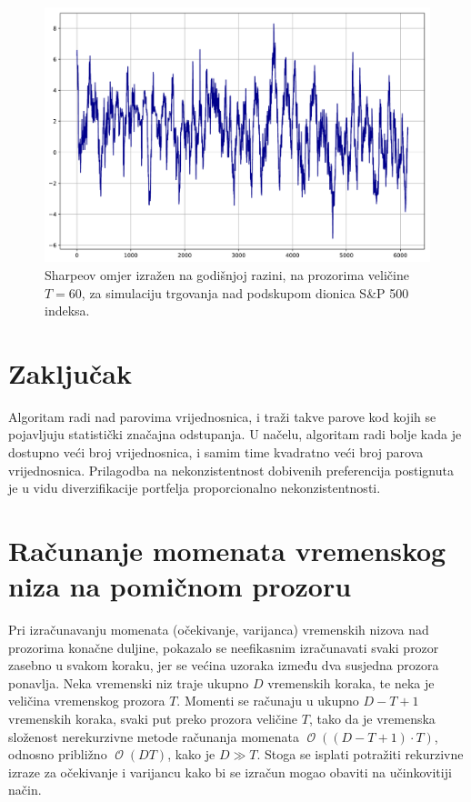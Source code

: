 \documentclass[lmodern, utf8, diplomski, numeric]{fer}
\newcommand{\bigO}[1]{\operatorname{\mathcal{O}}\q(#1\w)}
\newcommand{\q}{\left}
\newcommand{\w}{\right}
\begin{document}
  \begin{figure}[p]
    \centering
    \includegraphics[width=\linewidth]{graphics/sharpe1.pdf}
    \caption{Sharpeov omjer izražen na godišnjoj razini, na prozorima veličine $T = 60$, za simulaciju trgovanja nad podskupom dionica S\&P 500 indeksa.}
    \label{fig:sharpe3}
  \end{figure}
  
  
  \pagebreak
  

  \chapter{Zaključak}
  Algoritam radi nad parovima vrijednosnica, i traži takve parove kod kojih se pojavljuju statistički značajna odstupanja.
  U načelu, algoritam radi bolje kada je dostupno veći broj vrijednosnica, i samim time kvadratno veći broj parova vrijednosnica.
  Prilagodba na nekonzistentnost dobivenih preferencija postignuta je u vidu diverzifikacije portfelja proporcionalno nekonzistentnosti.
  
  
  

  \appendix
  \chapter{Računanje momenata vremenskog niza na pomičnom prozoru}
  \label{appendix}
  Pri izračunavanju momenata (očekivanje, varijanca) vremenskih nizova nad prozorima konačne duljine, pokazalo se neefikasnim izračunavati svaki prozor zasebno u svakom koraku, jer se većina uzoraka između dva susjedna prozora ponavlja.
  Neka vremenski niz traje ukupno $D$ vremenskih koraka, te neka je veličina vremenskog prozora $T$.
  Momenti se računaju u ukupno $D - T + 1$ vremenskih koraka, svaki put preko prozora veličine $T$, tako da je vremenska složenost nerekurzivne metode računanja momenata $\bigO{\q(D - T + 1\w)\cdot T}$, odnosno približno $\bigO{DT}$, kako je $D \gg T$.
  Stoga se isplati potražiti rekurzivne izraze za očekivanje i varijancu kako bi se izračun mogao obaviti na učinkovitiji način.
  
\end{document}
